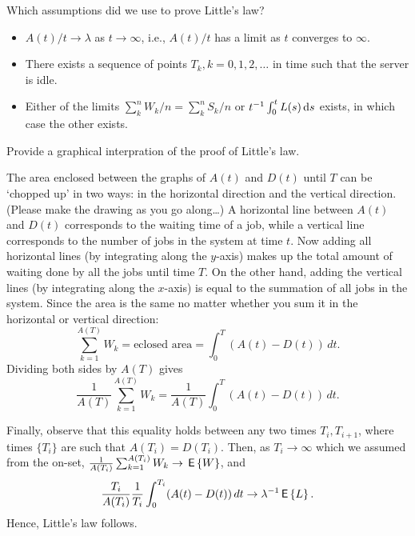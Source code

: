 \begin{question}
 Which assumptions did we use to prove Little's law?
  \begin{solution}
    \begin{itemize}
    \item 
 $A(t)/t \to \lambda$ as $t\to \infty$, i.e., $A(t)/t$ has a limit as $t$ converges to $\infty$. 
  \item There exists a sequence of points $T_k, k=0,1,2,\ldots$ in time such that the server is idle. 
  \item Either of the limits $\sum_k^n W_k/n = \sum_k^n S_k /n $ or
    $t^{-1}\int_0^t L(s) \,\text{d}s$ exists, in which case the other exists.
    \end{itemize}
  \end{solution}
\end{question}


\begin{question}
  Provide a graphical interpration of the proof of Little's law.
  \begin{hint}
    
  \end{hint}
  \begin{solution}
    The area enclosed between the graphs of $A(t)$ and $D(t)$ until
    $T$ can be `chopped up' in two ways: in the horizontal direction
    and the vertical direction. (Please make the drawing as you go
    along\ldots) A horizontal line between $A(t)$ and $D(t)$
    corresponds to the waiting time of a job, while a vertical line
    corresponds to the number of jobs in the system at time $t$. Now
    adding all horizontal lines (by integrating along the $y$-axis)
    makes up the total amount of waiting done by all the jobs until
    time $T$. On the other hand, adding the vertical lines (by
    integrating along the $x$-axis) is equal to the summation of all
    jobs in the system. Since the area is the same no matter whether
    you sum it in the horizontal or vertical direction:
    \begin{equation*}
      \sum_{k=1}^{A(T)}  W_k = \text{eclosed area} = \int_0^T (A(t)-D(t))\,dt. 
    \end{equation*}
 Dividing both sides by $A(T)$ gives
    \begin{equation*}
\frac{1}{A(T)} \sum_{k=1}^{A(T)}  W_k =\frac{1}{A(T)} \int_0^T (A(t)-D(t))\,dt. 
    \end{equation*}

    Finally, observe that this equality holds between any two times
    $T_i, T_{i+1}$, where times $\{T_i\}$ are such that
    $A(T_i)=D(T_i)$. Then, as $T_i\to \infty$ which we assumed from
    the on-set, $\frac{1}{A(T_i)} \sum_{k=1}^{A(T_i)} W_k\to \,\mathsf{E}\left\{W\right\}$,
    and
    \begin{equation*}
\frac{T_i}{A(T_i)}\frac{1}{T_i} \int_0^{T_i} (A(t)-D(t))\,dt \to \lambda^{-1} \,\mathsf{E}\left\{L\right\}.
    \end{equation*}
Hence, Little's law follows.
  \end{solution}
\end{question}


